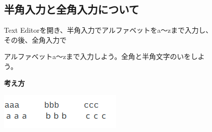 \documentclass[a4paper,12pt]{jarticle}
\begin{document}
\begin{figure}[ht]
  \subsection{\theExercise 半角入力と全角入力について}
  Text
  Editorを開き、半角入力でアルファベットをa〜zまで入力し、その後、全角入力で

  アルファベットa〜zまで入力しよう。全角と半角文字のいをしよう。

  {\bf\large 考え方}

  \centering
  \includegraphics[width=5.978cm]{textbook-img066.png}

  \begin{minipage}{16.578cm}

    \bigskip


\end{minipage}
\end{figure}
\end{document}
